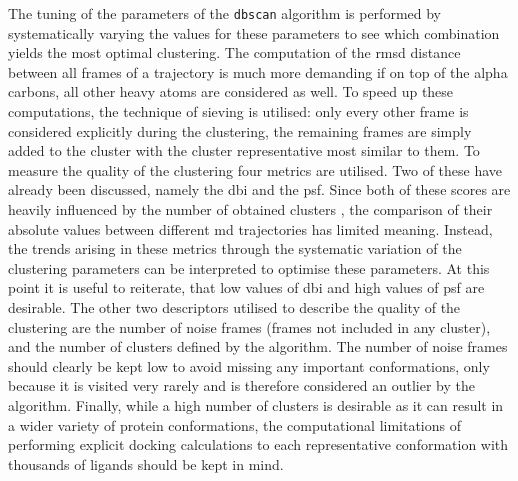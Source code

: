 The tuning of the parameters of the \texttt{dbscan} algorithm is performed by systematically varying the values for these parameters to see which combination yields the most optimal clustering.
The computation of the \gls{rmsd} distance between all frames of a trajectory is much more demanding if on top of the alpha carbons, all other heavy atoms are considered as well.
To speed up these computations, the technique of sieving is utilised: only every other frame is considered explicitly during the clustering, the remaining frames are simply added to the cluster with the cluster representative most similar to them.
To measure the quality of the clustering four metrics are utilised.
Two of these have already been discussed, namely the \gls{dbi} and the \gls{psf}.
Since both of these scores are heavily influenced by the number of obtained clusters \cite{cluster_perf}, the comparison of their absolute values between different \gls{md} trajectories has limited meaning.
Instead, the trends arising in these metrics through the systematic variation of the clustering parameters can be interpreted to optimise these parameters.
At this point it is useful to reiterate, that low values of \gls{dbi} and high values of \gls{psf} are desirable.
The other two descriptors utilised to describe the quality of the clustering are the number of noise frames (frames not included in any cluster), and the number of clusters defined by the algorithm.
The number of noise frames should clearly be kept low to avoid missing any important conformations, only because it is visited very rarely and is therefore considered an outlier by the algorithm.
Finally, while a high number of clusters is desirable as it can result in a wider variety of protein conformations, the computational limitations of performing explicit docking calculations to each representative conformation with thousands of ligands should be kept in mind.

